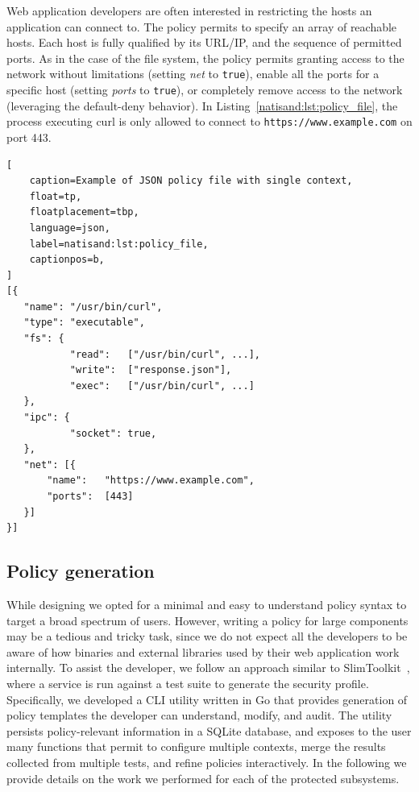 Web application developers are often interested in restricting the
hosts an application can connect to. The policy permits to
specify an array of reachable hosts. Each host is fully qualified by
its URL/IP, and the sequence of permitted ports. As in the case of the
file system, the policy permits granting access to the network without
limitations (setting {\em net} to {\tt true}), enable all the ports
for a specific host (setting {\em ports} to {\tt true}), or completely
remove access to the network (leveraging the default-deny
behavior). In Listing~\ref{natisand:lst:policy_file}, the process executing
curl is only allowed to connect to {\tt https://www.example.com} on
port 443.

\begin{lstlisting}[
    caption=Example of JSON policy file with single context,
    float=tp,
    floatplacement=tbp,
    language=json,
    label=natisand:lst:policy_file,
    captionpos=b,
]
[{
   "name": "/usr/bin/curl",
   "type": "executable",
   "fs": {
           "read":   ["/usr/bin/curl", ...],
           "write":  ["response.json"],
           "exec":   ["/usr/bin/curl", ...]
   },
   "ipc": {
           "socket": true,
   },
   "net": [{
	   "name":   "https://www.example.com",
	   "ports":  [443]
   }]
}]
\end{lstlisting}


\subsection{Policy generation}
\label{sect:sci-ffi-policy-generation}

While designing \natisand we opted for a minimal and easy to understand
policy syntax to target a broad spectrum of users. However, writing a
policy for large components may be a tedious and tricky task, since we
do not expect all the developers to be aware of how binaries and
external libraries used by their web application work internally. To
assist the developer, we follow an approach similar to
SlimToolkit~\cite{slimtoolkit}, where a service is run against a test
suite to generate the security profile.
Specifically, we developed a CLI utility written in Go that provides
generation of policy templates the developer can understand,
modify, and audit. The utility persists policy-relevant information
in a SQLite database, and exposes to the user many functions that
permit to configure multiple contexts, merge the results collected
from multiple tests, and refine policies interactively.
In the following we provide details on
the work we performed for each of the protected subsystems.

